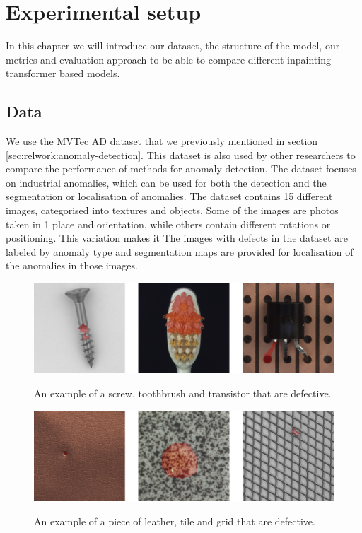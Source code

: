 \chapter{Experimental setup}\label{ch:experimental-setup}

In this chapter we will introduce our dataset, the structure of the model, our metrics and evaluation approach to be able to compare different inpainting transformer based models.

\section{Data}

We use the MVTec AD dataset that we previously mentioned in section \ref{sec:relwork:anomaly-detection}. This dataset is also used by other researchers \cite{pirnay_inpainting_2021, bergmann_improving_2019, zavrtanik_reconstruction_2021} to compare the performance of methods for anomaly detection. The dataset focuses on industrial anomalies, which can be used for both the detection and the segmentation or localisation of anomalies. The dataset contains 15 different images, categorised into textures and objects. Some of the images are photos taken in 1 place and orientation, while others contain different rotations or positioning. This variation makes it  The images with defects in the dataset are labeled by anomaly type and  segmentation maps are provided for localisation of the anomalies in those images.

\begin{figure}[h!]
\caption{An example of a screw, toothbrush and transistor that are defective.}
\centering
\includegraphics[width=\textwidth]{imgs/mvtec-example-objects.jpg}
\label{fig:experimental-setup:objects-example}
\end{figure}

\begin{figure}[h!]
\caption{An example of a piece of leather, tile and grid that are defective.}
\centering
\includegraphics[width=\textwidth]{imgs/mvtec-example-textures.jpg}
\label{fig:experimental-setup:textures-example}
\end{figure}

